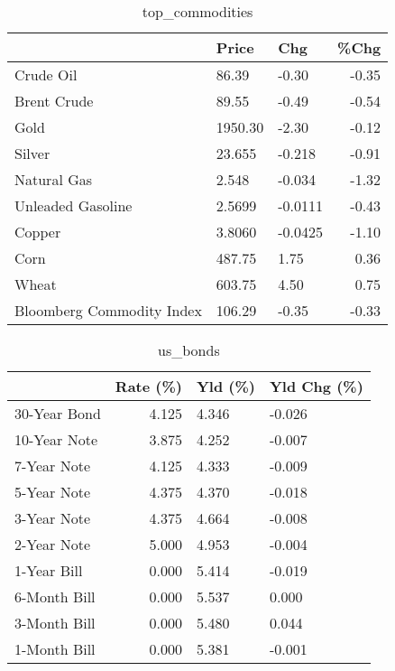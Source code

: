 \documentclass{article}%
\begin{document}
\begin{table}[htbp]%
\caption{top\_commodities}%
\centering%
\begin{adjustbox}{width=1\textwidth}%
\begin{tabular}{lllr}
\toprule
                          &   Price &     Chg &  \%Chg \\
\midrule
               Crude Oil  &   86.39 &   -0.30 & -0.35 \\
             Brent Crude  &   89.55 &   -0.49 & -0.54 \\
                    Gold  & 1950.30 &   -2.30 & -0.12 \\
                  Silver  &  23.655 &  -0.218 & -0.91 \\
             Natural Gas  &   2.548 &  -0.034 & -1.32 \\
       Unleaded Gasoline  &  2.5699 & -0.0111 & -0.43 \\
                  Copper  &  3.8060 & -0.0425 & -1.10 \\
                    Corn  &  487.75 &    1.75 &  0.36 \\
                   Wheat  &  603.75 &    4.50 &  0.75 \\
Bloomberg Commodity Index &  106.29 &   -0.35 & -0.33 \\
\bottomrule
\end{tabular}
%
\end{adjustbox}%
\end{table}

%


\begin{table}[htbp]%
\caption{us\_bonds}%
\centering%
\begin{adjustbox}{width=1\textwidth}%
\begin{tabular}{lrll}
\toprule
             &  Rate (\%) & Yld (\%) & Yld Chg (\%) \\
\midrule
30-Year Bond &     4.125 &   4.346 &      -0.026 \\
10-Year Note &     3.875 &   4.252 &      -0.007 \\
 7-Year Note &     4.125 &   4.333 &      -0.009 \\
 5-Year Note &     4.375 &   4.370 &      -0.018 \\
 3-Year Note &     4.375 &   4.664 &      -0.008 \\
 2-Year Note &     5.000 &   4.953 &      -0.004 \\
 1-Year Bill &     0.000 &   5.414 &      -0.019 \\
6-Month Bill &     0.000 &   5.537 &       0.000 \\
3-Month Bill &     0.000 &   5.480 &       0.044 \\
1-Month Bill &     0.000 &   5.381 &      -0.001 \\
\bottomrule
\end{tabular}
%
\end{adjustbox}%
\end{table}
\end{document}
